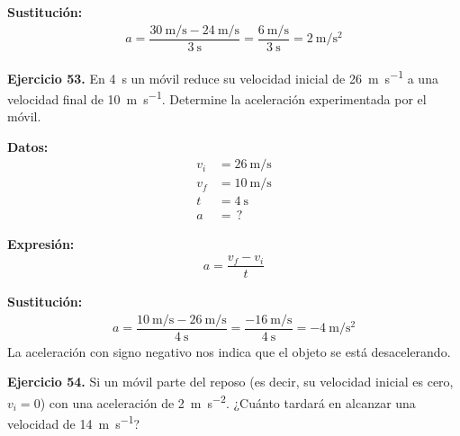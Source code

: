 \documentclass[14pt]{extarticle}
\begin{document}
\vspace{0.3cm}
\textbf{Sustitución:}
\begin{align*}
a = \dfrac{\displaystyle \SI[per-mode=fraction]{30}{\meter\per\second} - \SI[per-mode=fraction]{24}{\meter\per\second}}{\SI{3}{\second}} = \dfrac{\displaystyle \SI[per-mode=fraction]{6}{\meter\per\second}}{\SI{3}{\second}} = \SI[per-mode=fraction]{2}{\meter\per\square\second}
\end{align*}

\newpage

\textbf{Ejercicio 53. } En \SI{4}{\second} un móvil reduce su velocidad inicial de \SI{26}{\meter\per\second} a una velocidad final de \SI{10}{\meter\per\second}. Determine la aceleración experimentada por el móvil.

\vspace*{0.3cm}
\begin{minipage}[t]{0.4\linewidth}
\textbf{Datos:}
\begin{align*}
v_{i} &= \SI{26}{\meter\per\second} \\
v_{f} &= \SI{10}{\meter\per\second} \\
t &= \SI{4}{\second} \\
a &= \, ?
\end{align*}
\end{minipage}
\begin{minipage}[t]{0.4\linewidth}
\textbf{Expresión:}
\begin{align*}
a = \dfrac{v_{f} - v_{i}}{t}
\end{align*}
\end{minipage}

\vspace*{0.3cm}
\textbf{Sustitución:}
\begin{align*}
a = \dfrac{\displaystyle \SI[per-mode=fraction]{10}{\meter\per\second} - \SI[per-mode=fraction]{26}{\meter\per\second}}{\SI{4}{\second}} = \dfrac{\displaystyle - \SI[per-mode=fraction]{16}{\meter\per\second}}{\SI{4}{\second}} = - \SI[per-mode=fraction]{4}{\meter\per\square\second}
\end{align*}
La aceleración con signo negativo nos indica que el objeto se está desacelerando.

\vspace*{0.3cm}
\textbf{Ejercicio 54. } Si un móvil parte del reposo (es decir, su velocidad inicial es cero, $v_{i} = 0$) con una aceleración de \SI{2}{\meter\per\square\second}. ¿Cuánto tardará en alcanzar una velocidad de \SI{14}{\meter\per\second}?
\end{document}
